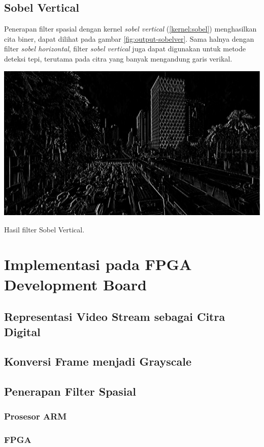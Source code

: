 \subsection{Sobel Vertical}
Penerapan filter spasial dengan kernel \textit{sobel vertical} (\ref{kernel:sobel}) menghasilkan cita biner, dapat dilihat pada gambar \ref{fig:output-sobelver}. Sama halnya dengan filter \textit{sobel horizontal}, filter \textit{sobel vertical} juga dapat digunakan untuk metode deteksi tepi, terutama pada citra yang banyak mengandung garis verikal.
\begin{afigure}
    \includegraphics[width=0.8\linewidth, center]{images/output-image/input1-sobelver.png}
    \caption{Hasil filter Sobel Vertical.}
    \label{fig:output-sobelver}
\end{afigure}


\section{Implementasi pada FPGA Development Board}
\blindtext
\subsection{Representasi Video Stream sebagai Citra Digital}
\subsection{Konversi Frame menjadi Grayscale}
\subsection{Penerapan Filter Spasial}
\subsubsection{Prosesor ARM}
\subsubsection{FPGA}
